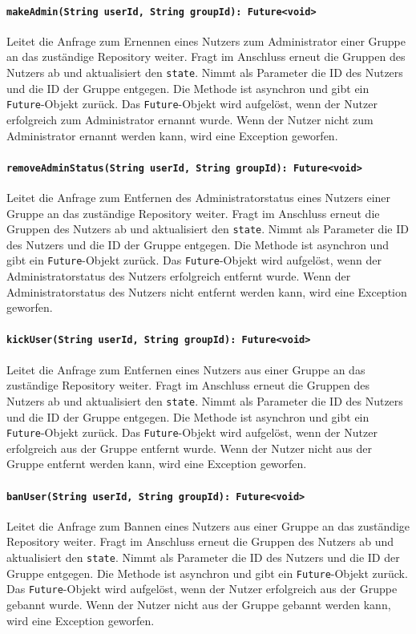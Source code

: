 \documentclass{entwurfsheft}
\begin{document}
\begin{sloppypar}
\paragraph{\texttt{makeAdmin(String userId, String groupId): Future<void>}}
Leitet die Anfrage zum Ernennen eines Nutzers zum Administrator einer Gruppe an das zuständige Repository weiter. Fragt im Anschluss erneut die Gruppen des Nutzers ab und aktualisiert den \texttt{state}. Nimmt als Parameter die ID des Nutzers und die ID der Gruppe entgegen. Die Methode ist asynchron und gibt ein \texttt{Future}-Objekt zurück. Das \texttt{Future}-Objekt wird aufgelöst, wenn der Nutzer erfolgreich zum Administrator ernannt wurde. Wenn der Nutzer nicht zum Administrator ernannt werden kann, wird eine Exception geworfen.
\paragraph{\texttt{removeAdminStatus(String userId, String groupId): Future<void>}}
Leitet die Anfrage zum Entfernen des Administratorstatus eines Nutzers einer Gruppe an das zuständige Repository weiter. Fragt im Anschluss erneut die Gruppen des Nutzers ab und aktualisiert den \texttt{state}. Nimmt als Parameter die ID des Nutzers und die ID der Gruppe entgegen. Die Methode ist asynchron und gibt ein \texttt{Future}-Objekt zurück. Das \texttt{Future}-Objekt wird aufgelöst, wenn der Administratorstatus des Nutzers erfolgreich entfernt wurde. Wenn der Administratorstatus des Nutzers nicht entfernt werden kann, wird eine Exception geworfen.
\paragraph{\texttt{kickUser(String userId, String groupId): Future<void>}}
Leitet die Anfrage zum Entfernen eines Nutzers aus einer Gruppe an das zuständige Repository weiter. Fragt im Anschluss erneut die Gruppen des Nutzers ab und aktualisiert den \texttt{state}. Nimmt als Parameter die ID des Nutzers und die ID der Gruppe entgegen. Die Methode ist asynchron und gibt ein \texttt{Future}-Objekt zurück. Das \texttt{Future}-Objekt wird aufgelöst, wenn der Nutzer erfolgreich aus der Gruppe entfernt wurde. Wenn der Nutzer nicht aus der Gruppe entfernt werden kann, wird eine Exception geworfen.
\paragraph{\texttt{banUser(String userId, String groupId): Future<void>}}
Leitet die Anfrage zum Bannen eines Nutzers aus einer Gruppe an das zuständige Repository weiter. Fragt im Anschluss erneut die Gruppen des Nutzers ab und aktualisiert den \texttt{state}. Nimmt als Parameter die ID des Nutzers und die ID der Gruppe entgegen. Die Methode ist asynchron und gibt ein \texttt{Future}-Objekt zurück. Das \texttt{Future}-Objekt wird aufgelöst, wenn der Nutzer erfolgreich aus der Gruppe gebannt wurde. Wenn der Nutzer nicht aus der Gruppe gebannt werden kann, wird eine Exception geworfen.

\end{sloppypar}
\end{document}
